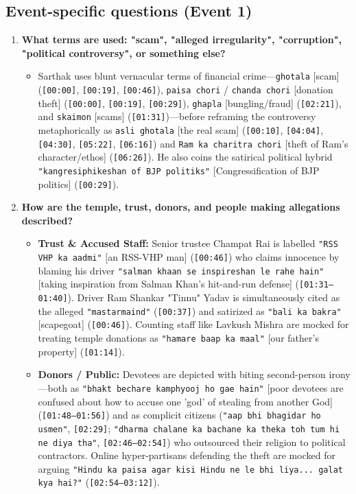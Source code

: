 \documentclass[10pt,a4paper]{article}
\begin{document}
\subsection*{Event-specific questions (Event 1)}
\begin{enumerate}[leftmargin=1.6em, itemsep=4pt, topsep=4pt]
  \item \textbf{What terms are used: "scam", "alleged irregularity", "corruption", "political controversy", or something else?}
  \begin{itemize}[leftmargin=1.4em, itemsep=2pt, topsep=2pt]
    \item Sarthak uses blunt vernacular terms of financial crime---\texttt{ghotala} [scam] (\texttt{[00:00]}, \texttt{[00:19]}, \texttt{[00:46]}), \texttt{paisa chori} / \texttt{chanda chori} [donation theft] (\texttt{[00:00]}, \texttt{[00:19]}, \texttt{[00:29]}), \texttt{ghapla} [bungling/fraud] (\texttt{[02:21]}), and \texttt{skaimon} [scams] (\texttt{[01:31]})---before reframing the controversy metaphorically as \texttt{asli ghotala} [the real scam] (\texttt{[00:10]}, \texttt{[04:04]}, \texttt{[04:30]}, \texttt{[05:22]}, \texttt{[06:16]}) and \texttt{Ram ka charitra chori} [theft of Ram's character/ethos] (\texttt{[06:26]}). He also coins the satirical political hybrid \texttt{"kangresiphikeshan of BJP politiks"} [Congressification of BJP politics] (\texttt{[00:29]}).
  \end{itemize}
  \item \textbf{How are the temple, trust, donors, and people making allegations described?}
  \begin{itemize}[leftmargin=1.4em, itemsep=2pt, topsep=2pt]
    \item \textbf{Trust \& Accused Staff:} Senior trustee Champat Rai is labelled \texttt{"RSS VHP ka aadmi"} [an RSS-VHP man] (\texttt{[00:46]}) who claims innocence by blaming his driver \texttt{"salman khaan se inspireshan le rahe hain"} [taking inspiration from Salman Khan's hit-and-run defense] (\texttt{[01:31--01:40]}). Driver Ram Shankar "Tinnu" Yadav is simultaneously cited as the alleged \texttt{"mastarmaind"} (\texttt{[00:37]}) and satirized as \texttt{"bali ka bakra"} [scapegoat] (\texttt{[00:46]}). Counting staff like Lavkush Mishra are mocked for treating temple donations as \texttt{"hamare baap ka maal"} [our father's property] (\texttt{[01:14]}).
    \item \textbf{Donors / Public:} Devotees are depicted with biting second-person irony---both as \texttt{"bhakt bechare kamphyooj ho gae hain"} [poor devotees are confused about how to accuse one 'god' of stealing from another God] (\texttt{[01:48--01:56]}) and as complicit citizens (\texttt{"aap bhi bhagidar ho usmen"}, \texttt{[02:29]}; \texttt{"dharma chalane ka bachane ka theka toh tum hi ne diya tha"}, \texttt{[02:46--02:54]}) who outsourced their religion to political contractors. Online hyper-partisans defending the theft are mocked for arguing \texttt{"Hindu ka paisa agar kisi Hindu ne le bhi liya... galat kya hai?"} (\texttt{[02:54--03:12]}).

\end{itemize}
\end{enumerate}
\end{document}
